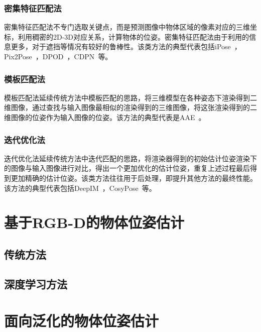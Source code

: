 \subsubsection{密集特征匹配法}
\par 密集特征匹配法不专门选取关键点，而是预测图像中物体区域的像素对应的三维坐标，利用稠密的2D-3D对应关系，计算物体的位姿。密集特征匹配法由于利用的信息更多，对于遮挡等情况有较好的鲁棒性。该类方法的典型代表包括iPose~\cite{hosseini2019ipose}，Pix2Pose~\cite{park2019pix2pose}，DPOD~\cite{zakharov2019dpod}，CDPN~\cite{li2019cdpn}等。
\subsubsection{模板匹配法}
\par 模板匹配法延续传统方法中模板匹配的思路，将三维模型在各种姿态下渲染得到二维图像，通过查找与输入图像最相似的渲染得到的三维图像，将这张渲染得到的二维图像的位姿作为输入图像的位姿。该方法的典型代表是AAE~\cite{sundermeyer2018implicit}。
\subsubsection{迭代优化法}
\par 迭代优化法延续传统方法中迭代匹配的思路，将渲染器得到的初始估计位姿渲染下的图像与输入图像进行对比，得出一个更加优化的估计位姿，重复上述过程最后得到更加精确的估计位姿。该类方法往往用于后处理，即提升其他方法的最终性能。该方法的典型代表包括DeepIM~\cite{li2018deepim}，CosyPose~\cite{labbe2020cosypose}等。
\section{基于RGB-D的物体位姿估计}
\subsection{传统方法}
\subsection{深度学习方法}
\section{面向泛化的物体位姿估计}
